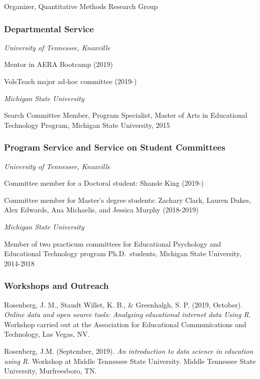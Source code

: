 \documentclass[14,]{article}
\begin{document}
Organizer, Quantitative Methods Research Group

\hypertarget{departmental-service}{%
\subsubsection{Departmental Service}\label{departmental-service}}

\emph{University of Tennessee, Knoxville}

Mentor in AERA Bootcamp (2019)

VolsTeach major ad-hoc committee (2019-)

\emph{Michigan State University}

Search Committee Member, Program Specialist, Master of Arts in
Educational Technology Program, Michigan State University, 2015

\hypertarget{program-service-and-service-on-student-committees}{%
\subsubsection{Program Service and Service on Student
Committees}\label{program-service-and-service-on-student-committees}}

\emph{University of Tennessee, Knoxville}

Committee member for a Doctoral student: Shande King (2019-)

Committee member for Master's degree students: Zachary Clark, Lauren
Dukes, Alex Edwards, Ana Michaelis, and Jessica Murphy (2018-2019)

\emph{Michigan State University}

Member of two practicum committees for Educational Psychology and
Educational Technology program Ph.D.~students, Michigan State
University, 2014-2018

\hypertarget{workshops-and-outreach}{%
\subsubsection{Workshops and Outreach}\label{workshops-and-outreach}}

Rosenberg, J. M., Staudt Willet, K. B., \& Greenhalgh, S. P. (2019,
October). \emph{Online data and open source tools: Analyzing educational
internet data Using R}. Workshop carried out at the Association for
Educational Communications and Technology, Las Vegas, NV.

Rosenberg, J.M. (September, 2019). \emph{An introduction to data science
in education using R}. Workshop at Middle Tennessee State University.
Middle Tennessee State University, Murfreesboro, TN.
\end{document}
